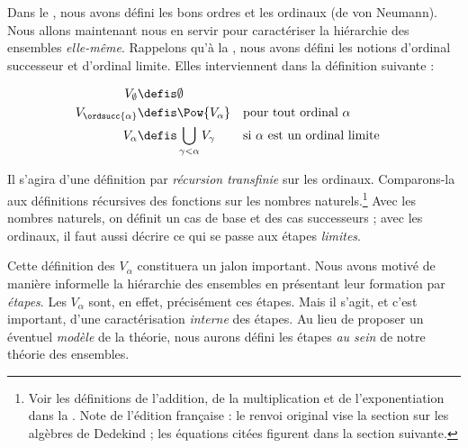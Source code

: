 \documentclass[../../../include/open-logic-section]{subfiles}
\begin{document}


Dans le , nous avons défini les bons ordres
et les ordinaux (de von Neumann). Nous allons maintenant nous en
servir pour caractériser la hiérarchie des ensembles \emph{elle-même}.
Rappelons qu'à la , nous avons défini
les notions d'ordinal successeur et d'ordinal limite. Elles
interviennent dans la définition suivante :

\begin{defn}
	\begin{align*}
	V_\emptyset &\defis \emptyset\\
	V_{\ordsucc{\alpha}} &\defis \Pow{V_\alpha} & &
	\text{pour tout ordinal }\alpha\\
	V_{\alpha} &\defis \bigcup_{\gamma < \alpha} V_\gamma & &
	\text{si }\alpha\text{ est un ordinal limite}
\end{align*}
\end{defn}
\noindent
Il s'agira d'une définition par \emph{récursion transfinie} sur les
ordinaux. Comparons-la aux définitions récursives des fonctions sur
les nombres naturels.\footnote{Voir les définitions de l'addition,
de la multiplication et de l'exponentiation dans la
. Note de l'édition française : le renvoi original vise la section sur les algèbres de Dedekind ; les équations citées figurent dans la section suivante.} Avec les nombres naturels,
on définit un cas de base et des cas successeurs ; avec les ordinaux,
il faut aussi décrire ce qui se passe aux étapes \emph{limites}.

Cette définition des $V_\alpha$ constituera un jalon important.
Nous avons motivé de manière informelle la hiérarchie des ensembles
en présentant leur formation par \emph{étapes}. Les $V_\alpha$ sont,
en effet, précisément ces étapes. Mais il s'agit, et c'est important,
d'une caractérisation \emph{interne} des étapes. Au lieu de proposer
un éventuel \emph{modèle} de la théorie, nous aurons défini les
étapes \emph{au sein} de notre théorie des ensembles.
\end{document}
